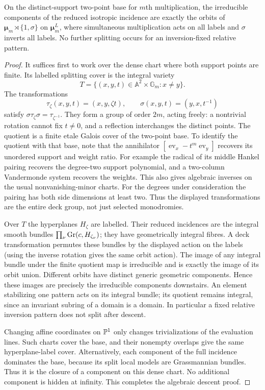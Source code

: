 \begin{proposition}
\label{prop:algebraic-phase-descent}
On the distinct-support two-point base for $m$th multiplication, the
irreducible components of the reduced isotropic incidence are exactly
the orbits of $\boldsymbol\mu_m\rtimes\{1,\sigma\}$ on
$\boldsymbol\mu_m^L$, where simultaneous multiplication acts on all
labels and $\sigma$ inverts all labels. No further splitting occurs
for an inversion-fixed relative pattern.
\end{proposition}
\begin{proof}
It suffices first to work over the dense chart where both support
points are finite. Its labelled splitting cover is the integral variety
\[
 T=\{(x,y,t)\in\mathbb A^2\times\mathbb G_m:x\ne y\}.
\]
The transformations
\[
 \tau_\zeta(x,y,t)=(x,y,\zeta t),\qquad
 \sigma(x,y,t)=(y,x,t^{-1})
\]
satisfy $\sigma\tau_\zeta\sigma=\tau_{\zeta^{-1}}$.
They form a group of order $2m$, acting freely: a nontrivial rotation
cannot fix $t\ne0$, and a reflection interchanges the distinct
points. The quotient is a finite etale Galois cover of the two-point
base. To identify the quotient with that base, note that the
annihilator $[\operatorname{ev}_x-t^m\operatorname{ev}_y]$ recovers
its unordered support and weight ratio. For example the radical of
its middle Hankel pairing recovers the degree-two support polynomial,
and a two-column Vandermonde system recovers the weights. This also
gives algebraic inverses on the usual nonvanishing-minor charts.
For the degrees under consideration the pairing has both side
dimensions at least two. Thus the displayed transformations are the
entire deck group, not just selected monodromies.

Over $T$ the hyperplanes $H_\zeta$ are labelled. Their reduced
incidences are the integral smooth bundles
$\prod_\nu\operatorname{Gr}(c,H_{\zeta_\nu})$; they have geometrically integral
fibres. A deck transformation permutes these bundles by the displayed
action on the labels (using the inverse rotation gives the same orbit
action). The image of any integral bundle under the finite quotient
map is irreducible and is exactly the image of its orbit union.
Different orbits have distinct generic geometric components. Hence
these images are precisely the irreducible components downstairs.
An element stabilizing one pattern acts on its integral bundle; its
quotient remains integral, since an invariant subring of a domain is
a domain. In particular a fixed relative inversion pattern does not
split after descent.

Changing affine coordinates on $\mathbb P^1$ only changes trivializations
of the evaluation lines. Such charts cover the base, and their
nonempty overlaps give the same hyperplane-label cover. Alternatively,
each component of the full incidence dominates the base, because its
split local models are Grassmannian bundles. Thus it is the closure
of a component on this dense chart. No additional component is hidden
at infinity. This completes the algebraic descent proof.
\end{proof}

